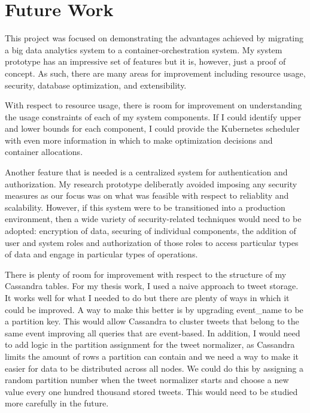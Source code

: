 
\chapter{Future Work} %

\label{Chapter9} %

This project was focused on demonstrating the advantages achieved by migrating a big data analytics system to a container-orchestration system. My system prototype has an impressive set of features but it is, however, just a proof of concept. As such, there are many areas for improvement including resource usage, security, database optimization, and extensibility.

With respect to resource usage, there is room for improvement on understanding the usage constraints of each of my system components. If I could identify upper and lower bounds for each component, I could provide the Kubernetes scheduler with even more information in which to make optimization decisions and container allocations.

Another feature that is needed is a centralized system for authentication and authorization. My research prototype deliberatly avoided imposing any security measures as our focus was on what was feasible with respect to reliablity and scalability. However, if this system were to be transitioned into a production environment, then a wide variety of security-related techniques would need to be adopted: encryption of data, securing of individual components, the addition of user and system roles and authorization of those roles to access particular types of data and engage in particular types of operations.

There is plenty of room for improvement with respect to the structure of my Cassandra tables. For my thesis work, I used a  naive approach to tweet storage. It works well for what I needed to do but there are plenty of ways in which it could be improved. A way to make this better is by upgrading event\_name to be a partition key. This would allow Cassandra to cluster tweets that belong to the same event improving all queries that are event-based. In addition, I would need to add logic in the partition assignment for the tweet normalizer, as Cassandra limits the amount of rows a partition can contain and we need a way to make it easier for data to be distributed across all nodes. We could do this by assigning a random partition number when the tweet normalizer starts and choose a new value every one hundred thousand stored tweets. This would need to be studied more carefully in the future.

